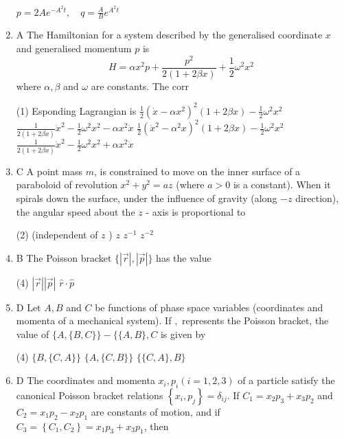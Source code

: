 \begin{enumerate}
\begin{tasks}
	\task[\textbf{d.}] $p=2 A e^{-A^{2} t}, \quad q=\frac{A}{B} e^{A^{2} t}$
\end{tasks}
\item A The Hamiltonian for a system described by the generalised coordinate $x$ and generalised momentum $p$ is
$$
H=\alpha x^{2} p+\frac{p^{2}}{2(1+2 \beta x)}+\frac{1}{2} \omega^{2} x^{2}
$$
where $\alpha, \beta$ and $\omega$ are constants. The corr
{}
 \begin{tasks}(1)
	\task[\textbf{a.}]Esponding Lagrangian is
	 $\frac{1}{2}\left(\dot{x}-\alpha x^{2}\right)^{2}(1+2 \beta x)-\frac{1}{2} \omega^{2} x^{2}$
	\task[\textbf{b.}]$\frac{1}{2(1+2 \beta x)} \dot{x}^{2}-\frac{1}{2} \omega^{2} x^{2}-\alpha x^{2} \dot{x}$
	\task[\textbf{c.}]$\frac{1}{2}\left(\dot{x}^{2}-\alpha^{2} x\right)^{2}(1+2 \beta x)-\frac{1}{2} \omega^{2} x^{2}$
	\task[\textbf{d.}] $\frac{1}{2(1+2 \beta x)} \dot{x}^{2}-\frac{1}{2} \omega^{2} x^{2}+\alpha x^{2} \dot{x}$
\end{tasks}
\item C A point mass $m$, is constrained to move on the inner surface of a paraboloid of revolution $x^{2}+y^{2}=a z$ (where $a>0$ is a constant). When it spirals down the surface, under the influence of gravity (along $-z$ direction), the angular speed about the $z$ - axis is proportional to
{}
 \begin{tasks}(2)
	 (independent of $z$ )
	\task[\textbf{b.}]$z$
	\task[\textbf{c.}] $z^{-1}$
	\task[\textbf{d.}]  $z^{-2}$
\end{tasks}
\item B The Poisson bracket $\{|\vec{r}|,|\vec{p}|\}$ has the value
{}
 \begin{tasks}(4)
	\task[\textbf{a.}]$|\vec{r}||\vec{p}|$
	\task[\textbf{b.}]$\hat{r} \cdot \hat{p}$
\end{tasks}
\item D Let $A, B$ and $C$ be functions of phase space variables (coordinates and momenta of a mechanical system). If ${,}$ represents the Poisson bracket, the value of $\{A,\{B, C\}\}-\{\{A, B\}, C$ is given by
{}
 \begin{tasks}(4)
	\task[\textbf{b.}]$\{B,\{C, A\}\}$
	\task[\textbf{c.}]$\{A,\{C, B\}\}$
	\task[\textbf{d.}] $\{\{C, A\}, B\}$
\end{tasks}
\item D The coordinates and momenta $x_{i}, p_{i}(i=1,2,3)$ of a particle satisfy the canonical Poisson bracket relations $\left\{x_{i}, p_{j}\right\}=\delta_{i j}$. If $C_{1}=x_{2} p_{3}+x_{3} p_{2}$ and $C_{2}=x_{1} p_{2}-x_{2} p_{1}$ are constants of motion, and if $C_{3}=\left\{C_{1}, C_{2}\right\}=x_{1} p_{3}+x_{3} p_{1}$, then

\end{enumerate}
